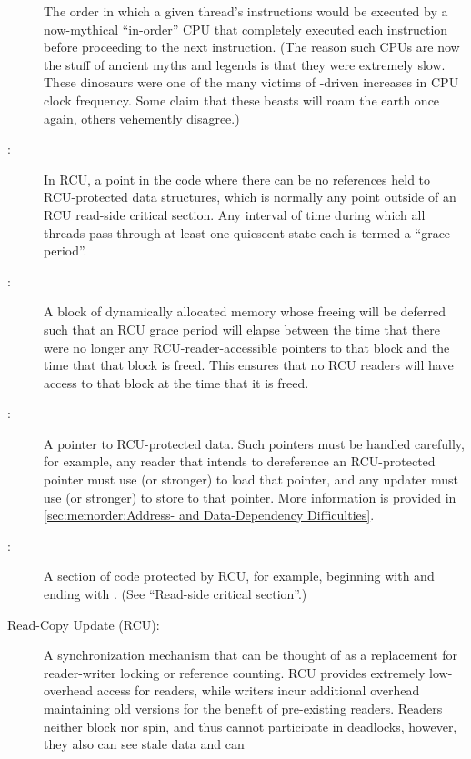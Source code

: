 \begin{description}
	The order in which a given thread's instructions
	would be executed by a now-mythical ``in-order'' CPU that
	completely executed each instruction before proceeding to
	the next instruction.
	(The reason such CPUs are now the stuff of ancient myths
	and legends is that they were extremely slow.
	These dinosaurs were one of the many victims of
	-driven increases in CPU clock frequency.
	Some claim that these beasts will roam the earth once again,
	others vehemently disagree.)
\item[\IXG{Quiescent State}:]
	In RCU, a point in the code where there can be no references held
	to RCU-protected data structures, which is normally any point
	outside of an RCU read-side critical section.
	Any interval of time during which all threads pass through at
	least one quiescent state each is termed a ``grace period''.
\item[\IXGaltr{RCU-Protected Data}{RCU-protected data}:]
	A block of dynamically allocated memory whose freeing will be
	deferred such that an RCU grace period will elapse between the
	time that there were no longer any RCU-reader-accessible pointers
	to that block and the time that that block is freed.
	This ensures that no RCU readers will have access to that block at
	the time that it is freed.
\item[\IXGaltr{RCU-Protected Pointer}{RCU-protected pointer}:]
	A pointer to RCU-protected data.
	Such pointers must be handled carefully, for example, any reader
	that intends to dereference an RCU-protected pointer must
	use  (or stronger) to load that pointer,
	and any updater must use  (or stronger)
	to store to that pointer.
	More information is provided in
	\cref{sec:memorder:Address- and Data-Dependency Difficulties}.
\item[\IXGh{RCU Read-Side}{Critical Section}:] %
	A section of code protected by RCU, for example, beginning with
	 and ending with .
	(See ``Read-side critical section''.)
\item[Read-Copy Update (RCU):]
	A synchronization mechanism that can be thought of as a replacement
	for reader-writer locking or reference counting.
	RCU provides extremely low-overhead access for readers, while
	writers incur additional overhead maintaining old versions
	for the benefit of pre-existing readers.
	Readers neither block nor spin, and thus cannot participate in
	deadlocks, however, they also can see stale data and can

\end{description}
